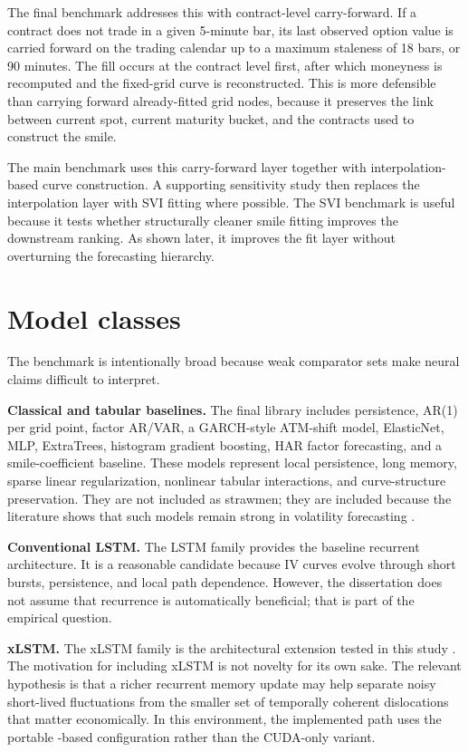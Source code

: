 \documentclass[12pt]{report}
\newcommand{\code}[1]{\begingroup\ttfamily\path{#1}\endgroup}
\begin{document}
The final benchmark addresses this with contract-level carry-forward. If a contract does not trade in a given 5-minute bar, its last observed option value is carried forward on the trading calendar up to a maximum staleness of 18 bars, or 90 minutes. The fill occurs at the contract level first, after which moneyness is recomputed and the fixed-grid curve is reconstructed. This is more defensible than carrying forward already-fitted grid nodes, because it preserves the link between current spot, current maturity bucket, and the contracts used to construct the smile.

The main benchmark uses this carry-forward layer together with interpolation-based curve construction. A supporting sensitivity study then replaces the interpolation layer with SVI fitting where possible. The SVI benchmark is useful because it tests whether structurally cleaner smile fitting improves the downstream ranking. As shown later, it improves the fit layer without overturning the forecasting hierarchy.

\section{Model classes}
The benchmark is intentionally broad because weak comparator sets make neural claims difficult to interpret.

\textbf{Classical and tabular baselines.} The final library includes persistence, AR(1) per grid point, factor AR/VAR, a GARCH-style ATM-shift model, ElasticNet, MLP, ExtraTrees, histogram gradient boosting, HAR factor forecasting, and a smile-coefficient baseline. These models represent local persistence, long memory, sparse linear regularization, nonlinear tabular interactions, and curve-structure preservation. They are not included as strawmen; they are included because the literature shows that such models remain strong in volatility forecasting \citep{engle1982,bollerslev1986,corsi2009,chen2024bspline}.

\textbf{Conventional LSTM.} The LSTM family provides the baseline recurrent architecture. It is a reasonable candidate because IV curves evolve through short bursts, persistence, and local path dependence. However, the dissertation does not assume that recurrence is automatically beneficial; that is part of the empirical question.

\textbf{xLSTM.} The xLSTM family is the architectural extension tested in this study \citep{beck2024xlstm}. The motivation for including xLSTM is not novelty for its own sake. The relevant hypothesis is that a richer recurrent memory update may help separate noisy short-lived fluctuations from the smaller set of temporally coherent dislocations that matter economically. In this environment, the implemented path uses the portable \code{mLSTM}-based configuration rather than the CUDA-only \code{sLSTM} variant.
\end{document}
